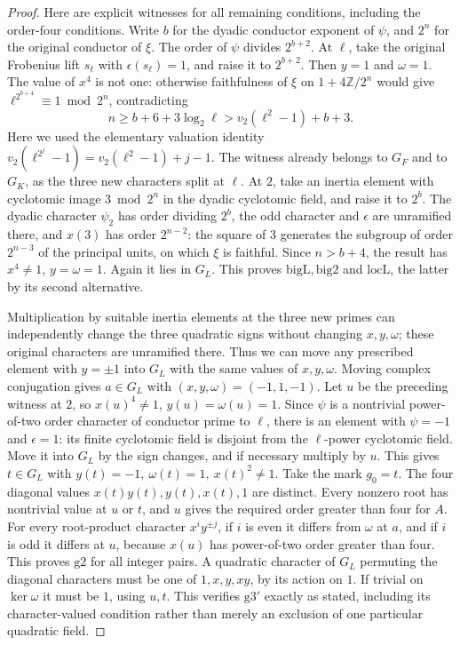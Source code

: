 \begin{proof}
Here are explicit witnesses for all remaining conditions,
including the order-four conditions. Write $b$ for the dyadic
conductor exponent of $\psi$, and $2^n$ for the original
conductor of $\xi$. The order of $\psi$ divides $2^{b+2}$.
At $\ell$, take the original Frobenius lift $s_\ell$ with
$\epsilon(s_\ell)=1$, and raise it to $2^{b+2}$.
Then $y=1$ and $\omega=1$. The value of $x^4$ is not one:
otherwise faithfulness of $\xi$ on $1+4\mathbb Z/2^n$
would give
$\ell^{2^{b+4}}\equiv1\bmod 2^n$, contradicting
\[
 n\ge b+6+3\log_2\ell>
 v_2(\ell^2-1)+b+3 .
\]
Here we used the elementary valuation identity
$v_2(\ell^{2^j}-1)=v_2(\ell^2-1)+j-1$.
The witness already belongs to $G_F$ and to $G_K$,
as the three new characters split at $\ell$.
At $2$, take an inertia element with cyclotomic image
$3\bmod2^n$ in the dyadic cyclotomic field, and raise it
to $2^b$. The dyadic character $\psi_2$ has order dividing
$2^b$, the odd character and $\epsilon$ are unramified
there, and $x(3)$ has order $2^{n-2}$: the square of $3$
generates the subgroup of order $2^{n-3}$ of the principal
units, on which $\xi$ is faithful. Since $n>b+4$, the
result has $x^4\ne1$, $y=\omega=1$. Again it lies in
$G_L$. This proves $\mathrm{bigL},\mathrm{big2}$ and
$\mathrm{locL}$, the latter by its second alternative.

Multiplication by suitable inertia elements at the three
new primes can independently change the three quadratic
signs without changing $x,y,\omega$; these original characters
are unramified there. Thus we can move any prescribed element
with $y=\pm1$ into $G_L$ with the same values of $x,y,\omega$.
Moving complex conjugation gives $a\in G_L$ with
$(x,y,\omega)=(-1,1,-1)$. Let $u$ be the preceding
witness at $2$, so $x(u)^4\ne1$, $y(u)=\omega(u)=1$.
Since $\psi$ is a nontrivial power-of-two order character
of conductor prime to $\ell$, there is an element with
$\psi=-1$ and $\epsilon=1$: its finite cyclotomic field
is disjoint from the $\ell$-power cyclotomic field.
Move it into $G_L$ by the sign changes, and if necessary
multiply by $u$. This gives $t\in G_L$ with
$y(t)=-1,\ \omega(t)=1,\ x(t)^2\ne1$.
Take the mark $g_0=t$. The four diagonal values
$x(t)y(t),y(t),x(t),1$ are distinct. Every nonzero root
has nontrivial value at $u$ or $t$, and $u$ gives the
required order greater than four for $A$.
For every root-product character $x^i y^{\pm j}$,
if $i$ is even it differs from $\omega$ at $a$, and if
$i$ is odd it differs at $u$, because $x(u)$ has power-of-two
order greater than four. This proves $\mathrm{g2}$ for
all integer pairs. A quadratic character of $G_L$ permuting
the diagonal characters must be one of $1,x,y,xy$, by its
action on $1$. If trivial on $\ker\omega$ it must be $1$,
using $u,t$. This verifies $\mathrm{g3'}$ exactly as stated,
including its character-valued condition rather than merely
an exclusion of one particular quadratic field.


\end{proof}
